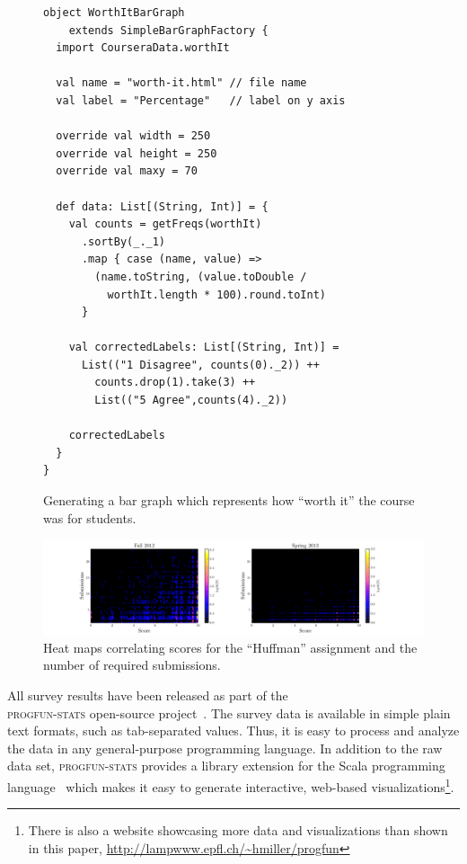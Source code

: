 \documentclass{sig-alternate}
\begin{document}
\begin{figure}[ht!]
  \begin{lstlisting}
object WorthItBarGraph
    extends SimpleBarGraphFactory {
  import CourseraData.worthIt

  val name = "worth-it.html" // file name
  val label = "Percentage"   // label on y axis

  override val width = 250
  override val height = 250
  override val maxy = 70

  def data: List[(String, Int)] = {
    val counts = getFreqs(worthIt)
      .sortBy(_._1)
      .map { case (name, value) =>
        (name.toString, (value.toDouble /
          worthIt.length * 100).round.toInt)
      }

    val correctedLabels: List[(String, Int)] =
      List(("1 Disagree", counts(0)._2)) ++
        counts.drop(1).take(3) ++
        List(("5 Agree",counts(4)._2))

    correctedLabels
  }
}
  \end{lstlisting}
  \caption{Generating a bar graph which
    represents how ``worth it'' the course was for students.}

  \label{fig:bar-chart}
\end{figure}

\begin{figure}[ht!]
  \centering
  \includegraphics[width=\textwidth]{plots/score-2d-histogram-fall2012-spring2013.pdf}
  \vspace{-0.8cm}
  \caption{Heat maps correlating scores for the ``Huffman'' assignment and the number
  of required submissions.}
  \label{fig:2d-histogram}
\end{figure}

All survey results have been released as part of the\\ \textsc{progfun-stats} open-source
project~\cite{progfun-stats}. The survey data is available in simple
plain text formats, such  as tab-separated values. Thus, it is easy to process
and analyze the data in any general-purpose programming language. In addition
to the raw data set, \textsc{progfun-stats} provides a library extension for
the Scala programming language~\cite{Odersky-Spoon-Venners07} which makes it
easy to generate interactive, web-based visualizations\footnote{There is also a website showcasing more data and visualizations than shown in this paper, \url{http://lampwww.epfl.ch/~hmiller/progfun}}.
\end{document}
